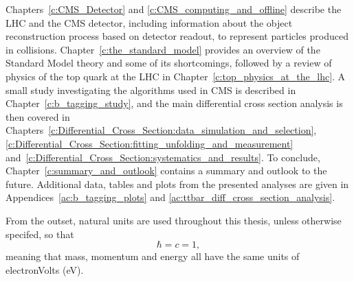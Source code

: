 Chapters~\ref{c:CMS_Detector} and \ref{c:CMS_computing_and_offline} describe the LHC and the CMS detector,
including information about the object reconstruction process based on detector readout, to represent
particles produced in collisions. Chapter~\ref{c:the_standard_model} provides an overview of the Standard
Model theory and some of its shortcomings, followed by a review of physics of the top quark at the LHC in
Chapter~\ref{c:top_physics_at_the_lhc}. A small study investigating the \btagging algorithms used in CMS is
described in Chapter~\ref{c:b_tagging_study}, and the main \ttbar differential cross section analysis is then
covered in Chapters~\ref{c:Differential_Cross_Section:data_simulation_and_selection},
\ref{c:Differential_Cross_Section:fitting_unfolding_and_measurement}
and~\ref{c:Differential_Cross_Section:systematics_and_results}. To conclude,
Chapter~\ref{c:summary_and_outlook} contains a summary and outlook to the future. Additional data, tables and
plots from the presented analyses are given in Appendices~\ref{ac:b_tagging_plots} and \ref{ac:ttbar_diff_cross_section_analysis}.

From the outset, natural units are used throughout this thesis, unless otherwise specifed, so that
\begin{equation}
\hbar = c = 1,
\end{equation}
meaning that mass, momentum and energy all have the same units of electronVolts (eV).